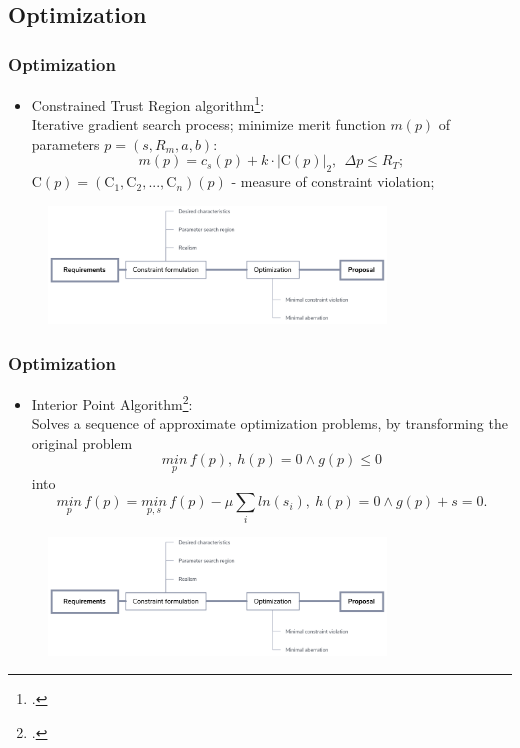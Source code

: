 \documentclass[10pt]{beamer}
\begin{document}
\subsection{Optimization}
\begin{frame}
  \frametitle{Optimization}
  \begin{itemize}
    \item Constrained Trust Region algorithm\footcite{scipyctr}:\\
      Iterative gradient search process; minimize merit function $m(p)$ of parameters $p = (s, R_m, a, b)$:
      \[
      m(p) = c_s(p) + k \cdot |\text{C}(p)|_2,\ \ \Delta p \leq R_T;
      \]
      C$(p) = (\text{C}_1,\text{C}_2,...,\text{C}_n)(p)$ - measure of constraint violation;
  \end{itemize}
  \vspace{0.5cm}
  \begin{figure}
    \includegraphics[width=0.8\textwidth]{blok_cxema}
  \end{figure}

\end{frame}

\begin{frame}
  \frametitle{Optimization}
  \vspace{0.1cm}
  \begin{itemize}
    \item Interior Point Algorithm\footcite{byrd2000trust}:\\
      Solves a sequence of approximate optimization problems, by transforming the original problem \[\underset{p}{min}\,f\left(p\right),\:h\left(p\right)=0\wedge g\left(p\right)\leq0\]
      into
      \[\underset{p}{min}\,f\left(p\right)=\underset{p,s}{min}\,f\left(p\right)-\mu\underset{i}{\sum}ln\left(s_{i}\right),\:h\left(p\right)=0\wedge g\left(p\right)+s=0.\]
  \end{itemize}
  \vspace{0.15cm}
  \begin{figure}
    \includegraphics[width=0.8\textwidth]{blok_cxema}
  \end{figure}

\end{frame}
\end{document}
